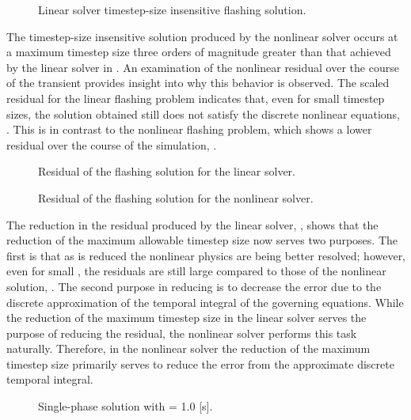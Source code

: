 \begin{figure}[h!tb]
\centering

\caption{Linear solver timestep-size insensitive flashing solution.}
\label{fig:flashingDtInsensitiveLin}
\end{figure}

The timestep-size insensitive solution produced by the nonlinear solver occurs at a maximum timestep size three orders of magnitude greater than that achieved by the linear solver in \cobra{}.
An examination of the nonlinear residual over the course of the transient provides insight into why this behavior is observed.
The scaled residual for the linear flashing problem indicates that, even for small timestep sizes, the solution obtained still does not satisfy the discrete nonlinear equations, .
This is in contrast to the nonlinear flashing problem, which shows a lower residual over the course of the simulation, .

\begin{figure}[h!tb]
\centering

\caption{Residual of the flashing solution for the linear solver.}
\label{fig:flashingResidualLin}
\end{figure}


\begin{figure}[h!tb]
\centering

\caption{Residual of the flashing solution for the nonlinear solver.}
\label{fig:flashingResidualNln}
\end{figure}

The reduction in the residual produced by the linear solver, , shows that the reduction of the maximum allowable timestep size now serves two purposes.
The first is that as \dtmax{} is reduced the nonlinear physics are being better resolved; however, even for small \dtmax{}, the residuals are still large compared to those of the nonlinear solution, .
The second purpose in reducing \dtmax{} is to decrease the error due to the discrete approximation of the temporal integral of the governing equations.
While the reduction of the maximum timestep size in the linear solver serves the purpose of reducing the residual, the nonlinear solver performs this task naturally.
Therefore, in the nonlinear solver the reduction of the maximum timestep size primarily serves to reduce the error from the approximate discrete temporal integral.

\begin{figure}[h!tb]
\centering

\caption{Single-phase solution with \dtmax{} = 1.0 {[s]}.}
\label{fig:single1pt000em0}
\end{figure}

